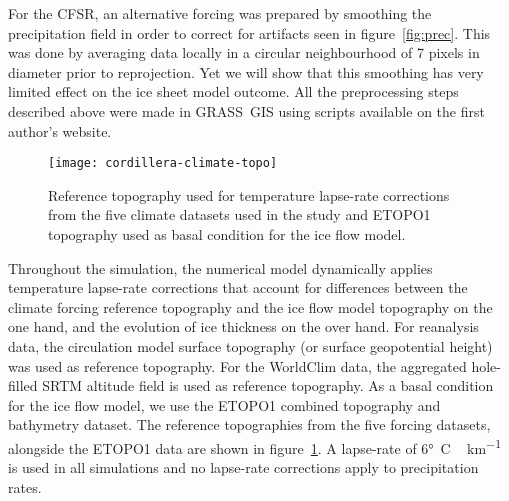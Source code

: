 For the CFSR, an alternative forcing was prepared by smoothing the precipitation field in order to correct for artifacts seen in figure~\ref{fig:prec}. This was done by averaging data locally in a circular neighbourhood of 7 pixels in diameter prior to reprojection. Yet we will show that this smoothing has very limited effect on the ice sheet model outcome. All the preprocessing steps described above were made in GRASS~GIS using scripts available on the first author's website.

\begin{figure}[t]
	\vspace*{2mm}
	\begin{center}
		\texttt{[image: cordillera-climate-topo]}
	\end{center}
	\caption{Reference topography used for temperature lapse-rate corrections from the five climate datasets used in the study and ETOPO1 topography used as basal condition for the ice flow model.}
	\label{fig:topo}
\end{figure}

Throughout the simulation, the numerical model dynamically applies temperature lapse-rate corrections that account for differences between the climate forcing reference topography and the ice flow model topography on the one hand, and the evolution of ice thickness on the over hand. For reanalysis data, the circulation model surface topography (or surface geopotential height) was used as reference topography. For the WorldClim data, the aggregated hole-filled SRTM altitude field is used as reference topography. As a basal condition for the ice flow model, we use the ETOPO1\citep{data:etopo1} combined topography and bathymetry dataset. The reference topographies from the five forcing datasets, alongside the ETOPO1 data are shown in figure~\ref{fig:topo}. A lapse-rate of 6\unit{\degree C\,km^{-1}} is used in all simulations and no lapse-rate corrections apply to precipitation rates.

